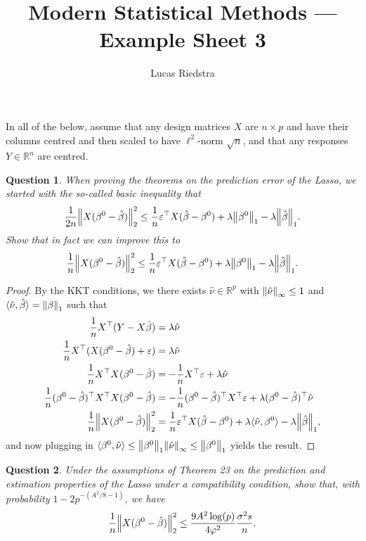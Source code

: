 \documentclass{article}
\title{Modern Statistical Methods --- Example Sheet 3} %
\author{Lucas Riedstra}
\theoremstyle{plain}
\newtheorem{question}{Question}
\theoremstyle{remark}
\renewcommand{\epsilon}{\varepsilon}
\renewcommand{\phi}{\varphi}
\newcommand{\Bb}{\mathbb}
\newcommand{\RR}{\Bb R}
\DeclarePairedDelimiter{\ang}{\langle}{\rangle}
\newcommand{\T}{^\top} %
\newcommand\eps\epsilon
\begin{document}
\maketitle
\begin{mdframed}
	In all of the below, assume that any design matrices $X$ are $n \times p$ and have their columns centred and then scaled to have $\ell^2$-norm $\sqrt n$, and that any responses $Y \in \RR^n$ are centred. 
\end{mdframed}
\begin{question}
	When proving the theorems on the prediction error of the Lasso, we started with the so-called basic inequality that
	\[
	\frac1{2n} \norm{X(\beta^0 - \hat\beta)}_2^2 \leq \frac1n \eps\T X(\hat\beta - \beta^0) + \lambda \norm{\beta^0}_1 - \lambda \norm{\hat\beta}_1. 
	\]
	Show that in fact we can improve this to 
		\[
	\frac1{n} \norm{X(\beta^0 - \hat\beta)}_2^2 \leq \frac1n \eps\T X(\hat\beta - \beta^0) + \lambda \norm{\beta^0}_1 - \lambda \norm{\hat\beta}_1. 
	\]
\end{question}

\begin{proof}
	By the KKT conditions, we there exists $\hat\nu \in \RR^p$ with $\norm{\hat\nu}_\infty \leq 1$ and $\ang{\hat\nu, \hat\beta} = \norm{\beta}_1$ such that 
	\begin{align*}
		\frac1n X\T (Y - X\hat\beta) &= \lambda\hat\nu \\
		\frac1n X\T (X(\beta^0 - \hat\beta) + \eps) &= \lambda\hat\nu \\
		\frac1n X\T X(\beta^0 - \hat\beta) &= - \frac1n X\T\eps + \lambda\hat\nu \\
		\frac1n (\beta^0 - \hat\beta)\T X\T X(\beta^0 - \hat\beta) &= -\frac1n (\beta^0 - \hat\beta)\T X\T\eps + \lambda (\beta^0 - \hat\beta)\T \hat\nu \\
		\frac1n \norm{X(\beta^0 -  \hat\beta)}_2^2 &= \frac1n \eps\T X(\hat\beta - \beta^0) + \lambda \ang{\hat\nu, \beta^0} - \lambda \norm{\hat\beta}_1,
		\end{align*}
	and now plugging in $\ang{\beta^0, \hat\nu} \leq \norm{\beta^0}_1 \norm{\hat\nu}_\infty \leq \norm{\beta^0}_1$ yields the result. 
\end{proof}

\begin{question}
	Under the assumptions of Theorem 23 on the prediction and estimation properties of the Lasso under a compatibility condition, show that, with probability $1 - 2p^{-(A^2/8 - 1)}$, we have
	\[
	\frac1n \norm{X(\beta^0 - \hat\beta)}_2^2 \leq \frac{9A^2 \log(p)}{4\phi^2} \frac{\sigma^2 s}{n}. 
	\]
\end{question}
\end{document}

